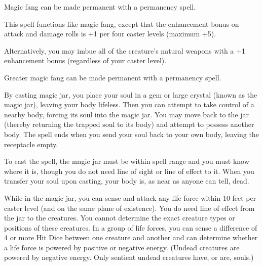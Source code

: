 \begin{multicols}{2}
\begin{small}
\smallskip\noindent Magic fang can be made permanent with a permanency spell.

\noindent This spell functions like magic fang, except that the enhancement bonus on attack and damage rolls is +1 per four caster levels (maximum +5).

\smallskip\noindent Alternatively, you may imbue all of the creature's natural weapons with a +1 enhancement bonus (regardless of your caster level).

\smallskip\noindent Greater magic fang can be made permanent with a permanency spell.

\noindent By casting magic jar, you place your soul in a gem or large crystal (known as the magic jar), leaving your body lifeless. Then you can attempt to take control of a nearby body, forcing its soul into the magic jar. You may move back to the jar (thereby returning the trapped soul to its body) and attempt to possess another body. The spell ends when you send your soul back to your own body, leaving the receptacle empty.

\smallskip\noindent To cast the spell, the magic jar must be within spell range and you must know where it is, though you do not need line of sight or line of effect to it. When you transfer your soul upon casting, your body is, as near as anyone can tell, dead. 

\smallskip\noindent While in the magic jar, you can sense and attack any life force within 10 feet per caster level (and on the same plane of existence). You do need line of effect from the jar to the creatures. You cannot determine the exact creature types or positions of these creatures. In a group of life forces, you can sense a difference of 4 or more Hit Dice between one creature and another and can determine whether a life force is powered by positive or negative energy. (Undead creatures are powered by negative energy. Only sentient undead creatures have, or are, souls.)


\end{small}
\end{multicols}
